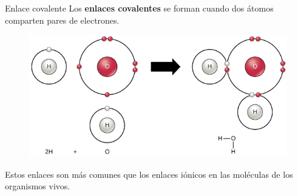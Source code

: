 \begin{infocard}{Enlace covalente}
    Los \textbf{enlaces covalentes} se forman cuando dos átomos comparten pares de electrones.
    \begin{figure}[H]
        \centering
        \includegraphics[width=\linewidth]{../images/2e56e620e79858d5dca7103b22dbde6eb5c52f0c}
    \end{figure}

    Estos enlaces son más comunes que los enlaces iónicos en las moléculas de los organismos vivos.
\end{infocard}